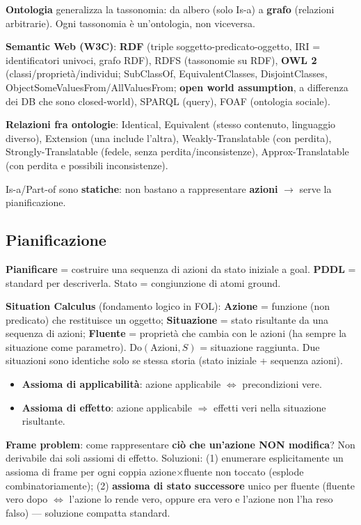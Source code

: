 \documentclass[10pt,a4paper]{article}
\begin{document}
\textbf{Ontologia} generalizza la tassonomia: da albero (solo Is-a) a \textbf{grafo} (relazioni arbitrarie). Ogni tassonomia è un'ontologia, non viceversa.

\textbf{Semantic Web (W3C)}: \textbf{RDF} (triple soggetto-predicato-oggetto, IRI = identificatori univoci, grafo RDF), RDFS (tassonomie su RDF), \textbf{OWL 2} (classi/proprietà/individui; SubClassOf, EquivalentClasses, DisjointClasses, ObjectSomeValuesFrom/AllValuesFrom; \textbf{open world assumption}, a differenza dei DB che sono closed-world), SPARQL (query), FOAF (ontologia sociale).

\textbf{Relazioni fra ontologie}: Identical, Equivalent (stesso contenuto, linguaggio diverso), Extension (una include l'altra), Weakly-Translatable (con perdita), Strongly-Translatable (fedele, senza perdita/inconsistenze), Approx-Translatable (con perdita e possibili inconsistenze).

Is-a/Part-of sono \textbf{statiche}: non bastano a rappresentare \textbf{azioni} $\to$ serve la pianificazione.

\subsection{Pianificazione}

\textbf{Pianificare} = costruire una sequenza di azioni da stato iniziale a goal. \textbf{PDDL} = standard per descriverla. Stato = congiunzione di atomi ground.

\textbf{Situation Calculus} (fondamento logico in FOL): \textbf{Azione} = funzione (non predicato) che restituisce un oggetto; \textbf{Situazione} = stato risultante da una sequenza di azioni; \textbf{Fluente} = proprietà che cambia con le azioni (ha sempre la situazione come parametro). $\text{Do}(\text{Azioni},S)$ = situazione raggiunta. Due situazioni sono identiche solo se stessa storia (stato iniziale + sequenza azioni).
\begin{itemize}
  \item \textbf{Assioma di applicabilità}: azione applicabile $\iff$ precondizioni vere.
  \item \textbf{Assioma di effetto}: azione applicabile $\Rightarrow$ effetti veri nella situazione risultante.
\end{itemize}

\textbf{Frame problem}: come rappresentare \textbf{ciò che un'azione NON modifica}? Non derivabile dai soli assiomi di effetto. Soluzioni: (1) enumerare esplicitamente un assioma di frame per ogni coppia azione$\times$fluente non toccato (esplode combinatoriamente); (2) \textbf{assioma di stato successore} unico per fluente (fluente vero dopo $\iff$ l'azione lo rende vero, oppure era vero e l'azione non l'ha reso falso) --- soluzione compatta standard.
\end{document}

